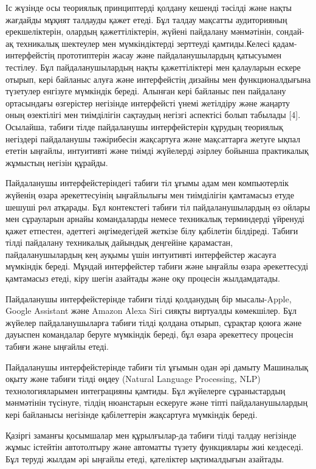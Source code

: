 \begin{multicols}{2}
Іс жүзінде осы теориялық принциптерді қолдану кешенді тәсілді және нақты
жағдайды мұқият талдауды қажет етеді. Бұл талдау мақсатты аудиторияның
ерекшеліктерін, олардың қажеттіліктерін, жүйені пайдалану мәнмәтінін,
сондай-ақ техникалық шектеулер мен мүмкіндіктерді зерттеуді
қамтиды.Келесі қадам-интерфейстің прототиптерін жасау және
пайдаланушылардың қатысуымен тестілеу. Бұл пайдаланушылардың нақты
қажеттіліктері мен қалауларын ескере отырып, кері байланыс алуға және
интерфейстің дизайны мен функционалдығына түзетулер енгізуге мүмкіндік
береді. Алынған кері байланыс пен пайдалану ортасындағы өзгерістер
негізінде интерфейсті үнемі жетілдіру және жаңарту оның өзектілігі мен
тиімділігін сақтаудың негізгі аспектісі болып табылады {[}4{]}.
Осылайша, табиғи тілде пайдаланушы интерфейстерін құрудың теориялық
негіздері пайдаланушы тәжірибесін жақсартуға және мақсаттарға жетуге
ықпал ететін ыңғайлы, интуитивті және тиімді жүйелерді әзірлеу бойынша
практикалық жұмыстың негізін құрайды.

Пайдаланушы интерфейстеріндегі табиғи тіл ұғымы адам мен компьютерлік
жүйенің өзара әрекеттесуінің ыңғайлылығы мен тиімділігін қамтамасыз
етуде шешуші рөл атқарады. Бұл контекстегі табиғи тіл пайдаланушылардың
өз ойлары мен сұрауларын арнайы командаларды немесе техникалық
терминдерді үйренуді қажет етпестен, әдеттегі әңгімедегідей жеткізе білу
қабілетін білдіреді. Табиғи тілді пайдалану техникалық дайындық
деңгейіне қарамастан, пайдаланушылардың кең ауқымы үшін интуитивті
интерфейстер жасауға мүмкіндік береді. Мұндай интерфейстер табиғи және
ыңғайлы өзара әрекеттесуді қамтамасыз етеді, кіру шегін азайтады және
оқу процесін жылдамдатады.

Пайдаланушы интерфейстерінде табиғи тілді қолданудың бір мысалы-Apple,
Google Assistant және Amazon Alexa Siri сияқты виртуалды көмекшілер. Бұл
жүйелер пайдаланушыларға табиғи тілді қолдана отырып, сұрақтар қоюға
және дауыспен командалар беруге мүмкіндік береді, бұл өзара әрекеттесу
процесін табиғи және ыңғайлы етеді.

Пайдаланушы интерфейстерінде табиғи тіл ұғымын одан әрі дамыту Машиналық
оқыту және табиғи тілді өңдеу (Natural Language Processing, NLP)
технологияларымен интеграцияны қамтиды. Бұл жүйелерге сұраныстардың
мәнмәтінін түсінуге, тілдің нюанстарын ескеруге және тіпті
пайдаланушылардың кері байланысы негізінде қабілеттерін жақсартуға
мүмкіндік береді.

Қазіргі заманғы қосымшалар мен құрылғылар-да табиғи тілді талдау
негізінде жұмыс істейтін автотолтыру және автоматты түзету функциялары
жиі кездеседі. Бұл теруді жылдам әрі ыңғайлы етеді, қателіктер
ықтималдығын азайтады.


\end{multicols}
